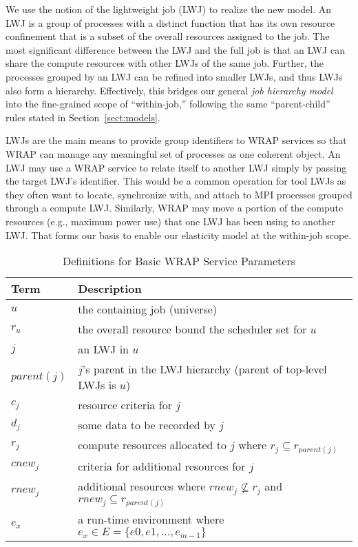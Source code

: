 We use the notion of the lightweight job (LWJ) to realize the new model. 
An LWJ is a group of processes with a distinct function 
that has its own resource confinement that is a subset of 
the overall resources assigned to the job.
The most significant difference between the LWJ and the full job is that an LWJ
can share the compute resources with other LWJs of the same job. 
Further, the processes grouped by an LWJ can be refined into smaller LWJs,
and thus LWJs also form a hierarchy. Effectively, this bridges 
our general {\em job hierarchy model} into the fine-grained 
scope of ``within-job,'' following the same ``parent-child'' rules stated
in Section~\ref{sect:models}.

LWJs are the main means to provide group identifiers to WRAP services
so that WRAP can manage any meaningful set of processes as one coherent object. 
An LWJ may use a WRAP service to relate itself 
to another LWJ simply by passing the target LWJ's identifier.
This would be a common operation for tool LWJs as they often want to 
locate, synchronize with, and attach to MPI processes grouped through a compute LWJ.
Similarly, WRAP may move a portion of the compute resources (e.g., maximum power use) 
that one LWJ has been using to another LWJ. That forms our basis to enable 
our elasticity model at the within-job scope.


\begin{table}
\centering
\begin{tabular}{|l|l|}
\hline
Term & Description \\
\hline
$u$ & the containing job (universe) \\
$r_u$ & the overall resource bound the scheduler set for $u$ \\
$j$ & an LWJ in $u$ \\
$parent(j)$ & $j$'s parent in the LWJ hierarchy (parent of top-level LWJs is $u$) \\
$c_j$ & resource criteria for $j$ \\
$d_j$ & some data to be recorded by $j$ \\
$r_j$ & compute resources allocated to $j$ where $r_j \subseteq r_{parent(j)}$ \\
$cnew_j$ & criteria for additional resources for $j$ \\
$rnew_j$ & additional resources where $rnew_j \not\subseteq r_j$ and $rnew_j \subseteq r_{parent(j)}$ \\
$e_x$ & a run-time environment where $e_x \in E = \{e0, e1, ..., e_{m-1}\}$ \\
\hline
\end{tabular}
\caption{Definitions for Basic WRAP Service Parameters}
\label{tab:def}
\end{table}

